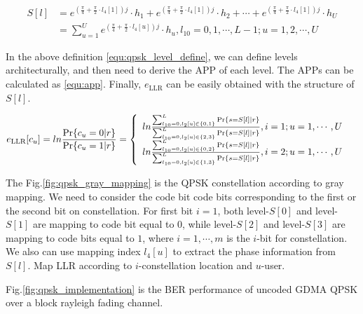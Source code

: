 \begin{align}
S[l] &= e^{(\frac{\pi}{4} + \frac{\pi}{2} \cdot l_{4}[1])j} \cdot h_{1} + e^{(\frac{\pi}{4} + \frac{\pi}{2} \cdot l_{4}[1])j} \cdot h_{2} + \cdots + e^{(\frac{\pi}{4} + \frac{\pi}{2} \cdot l_{4}[1])j} \cdot h_{U} 
\nonumber \\
&= \sum_{u=1}^{U}e^{(\frac{\pi}{4} + \frac{\pi}{2} \cdot l_{4}[u])j} \cdot h_{u}, l_{10}= 0, 1, \cdots, L-1; u=1, 2, \cdots, U
\label{equ:qpsk_level_define}
\end{align}

In the above definition \ref{equ:qpsk_level_define}, we can define levels architecturally, and then need to derive the APP of each level. The 
APPs can be calculated as \ref{equ:app}. Finally,  $e_{\text{LLR}}$ can be easily obtained with the structure of $S[l]$.

\begin{equation}
e_{\text{LLR}}[c_u] = ln \frac{\text{Pr}\{c_u=0|r\}}{\text{Pr}\{c_u=1|r\}} 
\nonumber \\ = 
\left\{
             \begin{array}{lr}
             ln \frac{\sum_{l_{10}=0, l_{2}[u]\in\{0,1\}}^{L}\text{Pr}\{s=S[l]|r\}}{\sum_{l_{10}=0, l_{2}[u]\in\{2,3\}}^{L}\text{Pr}\{s=S[l]|r\}}, i = 1; u=1,\cdots, U &  \\
             ln \frac{\sum_{l_{10}=0, l_{2}[u]\in\{0,2\}}^{L}\text{Pr}\{s=S[l]|r\}}{\sum_{l_{10}=0, l_{2}[u]\in\{1,3\}}^{L}\text{Pr}\{s=S[l]|r\}},
i = 2; u=1,\cdots, U & \\ 
             \end{array}
\right.
\label{equ:implementation_3}
\end{equation}

	The Fig.\ref{fig:qpsk_gray_mapping} is the QPSK constellation according to gray mapping. We need to consider the code bit code bits corresponding to the first or the second bit on constellation. For first bit $i=1$, both level-$S[0]$ and level-$S[1]$ are mapping to code bit equal to $0$, while level-$S[2]$ and level-$S[3]$ are mapping to code bits equal to $1$, where $i=1,\cdots, m$ is the $i$-bit for constellation. We also can use mapping index $l_{4}[u]$ to extract the phase information from $S[l]$. Map LLR according to $i$-constellation location and $u$-user. 
	
	Fig.\ref{fig:qpsk_implementation} is the BER performance of uncoded GDMA QPSK over a block rayleigh fading channel.

